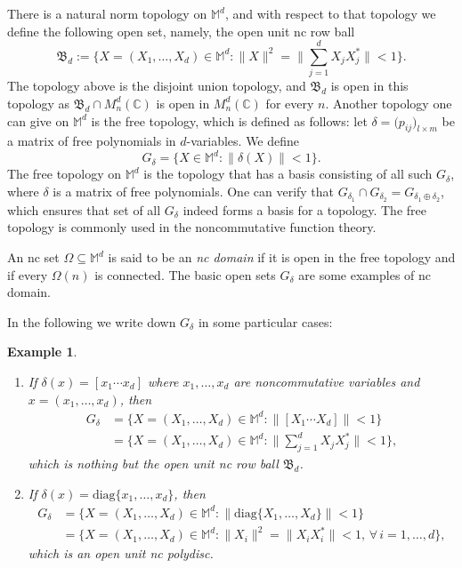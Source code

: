 \documentclass[12pt]{amsart}%
\newtheorem{example}[theorem]{Example}
\numberwithin{equation}{section}
\newcommand{\bM}{\mathbb{M}}
\newcommand{\fB}{{\mathfrak{B}}}
\newcommand{\C}{\mathbb{C}}
\begin{document}
There is a natural norm topology on $\bM^d$, and with respect to that topology we define the following open set, namely, the open unit nc row ball
\[
\fB_d:=\Big\{X=(X_1,\ldots,X_d)\in\bM^d:\|X\|^2=\Big\|\sum_{j=1}^dX_jX_j^*\Big\| <1\Big\}.
\] 
The topology above is the disjoint union topology, and $\fB_d$ is open in this topology as $\fB_d\cap M_n^d(\C)$ is open in $M_n^d(\C)$ for every $n$. Another topology one can give on $\bM^d$ is the free topology, which is defined as follows: let $\delta=\big(p_{ij}\big)_{l\times m}$ be a matrix of free polynomials in $d$-variables. We define 
\[
G_{\delta}=\{X\in\bM^d:\|\delta(X)\|<1\}.
\]
The free topology on $\bM^d$ is the topology that has a basis consisting of all such $G_\delta$, where $\delta$ is a matrix of free polynomials. One can verify that $G_{\delta_1}\cap G_{\delta_2}=G_{\delta_1\oplus\delta_2}$, which ensures that set of all $G_{\delta}$ indeed forms a basis for a topology. The free topology is commonly used in the noncommutative function theory.  

An nc set $\Omega\subseteq \bM^d$ is said to be an \textit{nc domain} if it is open in the free topology and if every $\Omega(n)$ is connected. The basic open sets $G_{\delta}$ are some examples of nc domain.

In the following we write down $G_{\delta}$ in some particular cases:
\begin{example}
\begin{enumerate}
    \item If $\delta(x)=[x_1\cdots x_d]$ where $x_1,\ldots,x_d$ are noncommutative variables and $x=(x_1,\ldots,x_d)$, then 
    \begin{align*}
        G_{\delta}&=\big\{X=(X_1,\ldots,X_d)\in\bM^d:\|[X_1\cdots X_d]\| <1\big\}\\
        &=\Big\{X=(X_1,\ldots,X_d)\in\bM^d:\Big\|\sum_{j=1}^dX_jX_j^*\Big\| <1\Big\},
    \end{align*}
which is nothing but the open unit nc row ball $\fB_d$.

\item If $\delta(x)=\text{diag}\{x_1,\ldots,x_d\}$, then 
\begin{align*}
    G_{\delta}&=\big\{X=(X_1,\ldots,X_d)\in\bM^d:\|\text{diag}\{X_1,\ldots,X_d\}\| <1\big\}\\
        &=\big\{X=(X_1,\ldots,X_d)\in\bM^d:\|X_i\|^2=\|X_iX_i^*\|<1,\,\forall\,i=1,\ldots,d \big\},
\end{align*}
which is an open unit nc polydisc.
\end{enumerate}
\end{example}
\end{document}

